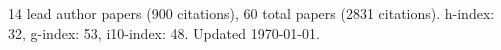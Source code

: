 14 lead author papers (900 citations),
60 total papers (2831 citations).\newline
h-index: 32, g-index: 53, i10-index: 48. Updated \today.
